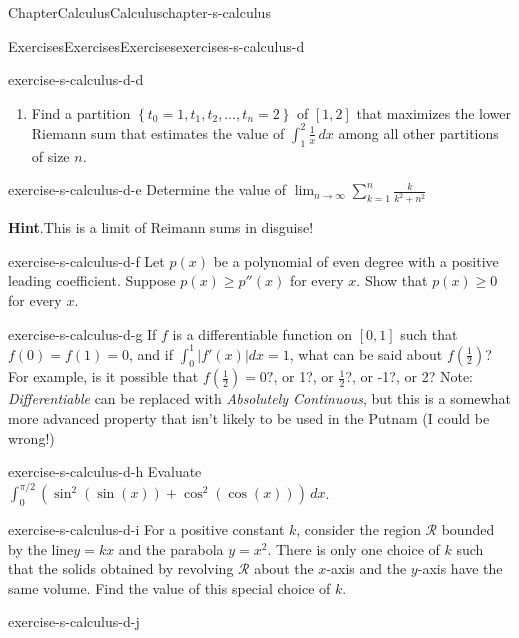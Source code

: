 \documentclass[oneside,10pt,]{book}
\newcommand{\blocktitlefont}{\relax}
\numberwithin{equation}{section}
\begin{document}
\begin{chapterptx}{Chapter}{Calculus}{}{Calculus}{}{}{chapter-s-calculus}
\begin{exercises-section}{Exercises}{Exercises}{}{Exercises}{}{}{exercises-s-calculus-d}
\begin{divisionexercise}{3}{}{}{exercise-s-calculus-d-d}
\begin{enumerate}[label=(\alph*)]
\item{}Find a partition \(\left\{t_0=1,t_1,t_2,\ldots , t_n=2\right\}\) of \([1,2]\) that maximizes the lower Riemann sum that estimates the value of \(\int_1^2 \frac{1}{x} \, dx\) among all other partitions of size \(n\).%
\end{enumerate}
%
\end{divisionexercise}%
\begin{divisionexercise}{4}{}{}{exercise-s-calculus-d-e}%
Determine the value of \(\lim _{n\to \infty }\sum _{k=1}^n \frac{k}{k^2+n^2}\)%
\par\smallskip%
\noindent\textbf{\blocktitlefont Hint}.\hypertarget{hint-s-calculus-d-e-b}{}\quad{}This is a limit of Reimann sums in disguise!%
\end{divisionexercise}%
\begin{divisionexercise}{5}{}{}{exercise-s-calculus-d-f}%
Let \(p(x)\) be a polynomial of even degree with a positive leading coefficient. Suppose \(p(x)\geq p''(x)	\) for every \(x\). Show that \(p(x) \geq  0\) for every \(x\).%
\end{divisionexercise}%
\begin{divisionexercise}{6}{}{}{exercise-s-calculus-d-g}%
If \(f\) is a differentiable function on \([0,1]\) such that \(f(0)=f(1)=0\), and if \(\int_0^1 \left| f'(x)\right| dx=1\), what can be said about \(f\left(\frac{1}{2}\right)\)? For example, is it possible that \(f\left(\frac{1}{2}\right)=0?\), or 1?, or \(\frac{1}{2}\)?, or -1?, or 2? Note: \emph{Differentiable} can be replaced with \emph{Absolutely Continuous}, but this is a somewhat more advanced property that isn't likely to be used in the Putnam (I could be wrong!)%
\end{divisionexercise}%
\begin{divisionexercise}{7}{}{}{exercise-s-calculus-d-h}%
Evaluate \(\int_{ 0}^{ \pi /2} \left(\sin ^2(\sin (x))+\cos ^2(\cos (x))\right) \, dx\).%
\end{divisionexercise}%
\begin{divisionexercise}{8}{}{}{exercise-s-calculus-d-i}%
For a positive constant \(k\), consider the region \(\mathcal{R}\) bounded by the line\(y = k x\) and the parabola \(y = x^2\). There is only one choice of \(k\) such that the solids obtained by revolving \(\mathcal{R}\) about the \(x\)-axis and the \(y\)-axis have the same volume. Find the value of this special choice of \(k\).%
\end{divisionexercise}%
\begin{divisionexercise}{9}{}{}{exercise-s-calculus-d-j}%

\end{divisionexercise}
\end{exercises-section}
\end{chapterptx}
\end{document}
